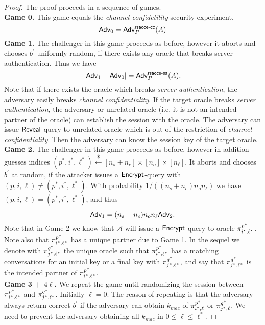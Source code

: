 \begin{proof}
 The proof proceeds in a sequence of games. \vspace{10pt}\\
 \textbf{Game 0.} This game equals the \textit{channel confidetility} security experiment.
 \begin{equation}
  \mathsf{Adv}_0 = \mathsf{Adv}^{\mathsf{rsacce\textsc{-} cc}}_{P}(A)
 \end{equation}%
%
%
 \textbf{Game 1.} The challenger in this game proceeds as before, however it aborts and chooses $b^{\prime}$ uniformly random, if there exists any oracle that breaks server authentication. Thus we have
 \begin{equation}
  |\mathsf{Adv}_1 - \mathsf{Adv}_0| = \mathsf{Adv}^{\mathsf{rsacce\textsc{-} sa}}_{P}(A).
 \end{equation}%
 Note that if there exists the oracle which breaks \textit{server authentication}, the adversary easily breaks \textit{channel confidentiality}. If the target oracle breaks \textit{server authentication}, the adversary or unrelated oracle (i.e. it is not an intended partner of the oracle) can establish the session with the oracle. The adversary can issue $\mathsf{Reveal}$-query to unrelated oracle which is out of the restriction of \textit{channel confidentiality}. Then the adversary can know the session key of the target oracle.
\vspace{10pt}\\%
%
%
 \textbf{Game 2.} The challenger in this game proceeds as before, however in addition guesses indices $(p^{\ast}, i^{\ast}, \ell^{\ast}) \xleftarrow{\$} [n_s + n_c] \times [n_o] \times [n_{\ell}]$. It aborts and chooses $b^{\prime}$ at random, if the attacker issues a $\mathsf{Encrypt}$-query with $(p,i,\ell) \neq (p^{\ast}, i^{\ast}, \ell^{\ast})$. With probability $1/((n_s+n_c)n_o n_{\ell})$ we have $(p,i,\ell) = (p^{\ast}, i^{\ast}, \ell^{\ast})$, and thus
 \begin{equation}
  \mathsf{Adv}_1 = (n_s + n_c) n_o n_{\ell}\mathsf{Adv}_2.
 \end{equation}%
 Note that in Game 2 we know that $\mathcal{A}$ will issue a $\mathsf{Encrypt}$-query to oracle $\pi^{p^{\ast}}_{i^{\ast},\ell^{\ast}}$. Note also that $\pi^{p^{\ast}}_{i^{\ast},\ell^{\ast}}$ has a unique partner due to Game 1. In the sequel we denote with $\pi^{q^{\ast}}_{j^{\ast},\ell^{\ast}}$ the unique oracle such that $\pi^{p^{\ast}}_{i^{\ast},\ell^{\ast}}$ has a matching conversations for an initial key or a final key with $\pi^{q^{\ast}}_{j^{\ast},\ell^{\ast}}$, and say that $\pi^{q^{\ast}}_{j^{\ast},\ell^{\ast}}$ is the intended partner of $\pi^{p^{\ast}}_{i^{\ast},\ell^{\ast}}$.
\vspace{10pt}\\%
%
%
 \textbf{Game 3 + $4\ell$.} We repeat the game until randomizing the session between $\pi^{p^{\ast}}_{i^{\ast},\ell^{\ast}}$ and $\pi^{q^{\ast}}_{j^{\ast},\ell^{\ast}}$. Initially $\ell = 0$. The reason of repeating is that the adversary always return correct $b^{\prime}$ if the adversary can obtain $k_{mac}$ of $\pi^{p^{\ast}}_{i^{\ast},\ell}$ or $\pi^{q^{\ast}}_{j^{\ast},\ell}$. We need to prevent the adversary obtaining all $k_{mac}$ in $ 0 \leq \ell \leq \ell^{\ast}$.

\end{proof}
